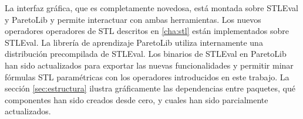 La interfaz gráfica, que es completamente novedosa, está montada sobre STLEval y ParetoLib y permite interactuar con ambas herramientas.
Los nuevos operadores operadores de STL descritos en \ref{cha:stl} están implementados sobre STLEval. 
La librería de aprendizaje ParetoLib utiliza internamente una distribución precompilada de STLEval.
Los binarios de STLEval en ParetoLib han sido actualizados para exportar las nuevas funcionalidades y permitir minar fórmulas STL paramétricas con los operadores introducidos en este trabajo.
La sección \ref{sec:estructura} ilustra gráficamente las dependencias entre paquetes, qué componentes han sido creados desde cero, y cuales han sido parcialmente actualizados.


